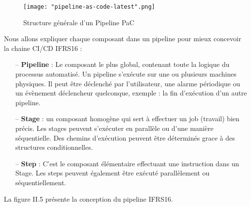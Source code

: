 \begin{spacing}{1.2}
\begin{figure}[!ht]\centering
\texttt{[image: "pipeline-as-code-latest".png]}
\caption{Structure générale d'un Pipeline PaC}
\label{fig:fig1}
\end{figure}
\FloatBarrier
Nous allons expliquer chaque composant dans un pipeline pour mieux concevoir la chaine CI/CD IFRS16 :
\begin{itemize}
\setlength\itemsep{0em}
\item[--] \textbf{Pipeline} : 
Le composant le plus global, contenant toute la logique du processus automatisé. Un pipeline s'exécute sur une ou plusieurs machines physiques. Il peut être déclenché par l'utilisateur, une alarme périodique ou un évènement déclencheur quelconque, exemple : la fin d'exécution d'un autre pipeline.
\item[--] \textbf{Stage} : un composant homogène qui sert à effectuer un job (travail) bien précis. Les stages peuvent s'exécuter en parallèle ou d'une manière séquentielle. Des chemins d'exécution peuvent être déterminés grace à des structures conditionnelles. 
\item[--] \textbf{Step} : C'est le composant élémentaire effectuant une instruction dans un Stage. Les steps peuvent également être exécuté parallèlement ou séquentiellement. 
\end{itemize}
La figure II.5 présente la conception du pipeline IFRS16. 


\end{spacing}

